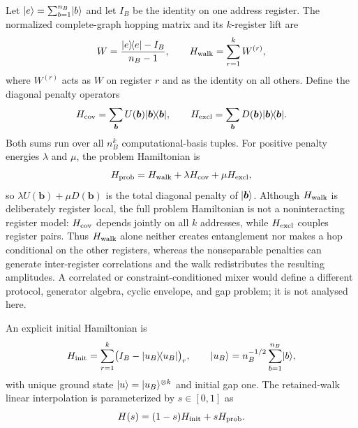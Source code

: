 Let $\lvert e\rangle=\sum_{b=1}^{n_B}\lvert b\rangle$ and let $I_B$ be the
identity on one address register.  The normalized complete-graph hopping
matrix and its $k$-register lift are
\begin{equation}
 W=\frac{\lvert e\rangle\!\langle e\rvert-I_B}{n_B-1},
 \qquad
 H_{\rm walk}=\sum_{r=1}^k W^{(r)},
 \label{eq:walk-definition}
\end{equation}
where $W^{(r)}$ acts as $W$ on register $r$ and as the identity on all
others.  Define the diagonal penalty operators
\begin{equation}
 H_{\rm cov}=\sum_{\boldsymbol b}U(\boldsymbol b)
 \lvert\boldsymbol b\rangle\!\langle\boldsymbol b\rvert,
 \qquad
 H_{\rm excl}=\sum_{\boldsymbol b}D(\boldsymbol b)
 \lvert\boldsymbol b\rangle\!\langle\boldsymbol b\rvert.
 \label{eq:penalty-definitions}
\end{equation}
Both sums run over all $n_B^k$ computational-basis tuples.
For positive penalty energies $\lambda$ and $\mu$, the problem Hamiltonian
is
\begin{equation}
 H_{\rm prob}=H_{\rm walk}+\lambda H_{\rm cov}+\mu H_{\rm excl},
 \label{eq:hprob-rewrite}
\end{equation}
so $\lambda U(\boldsymbol b)+\mu D(\boldsymbol b)$ is the total diagonal
penalty of $\lvert\boldsymbol b\rangle$.  Although $H_{\rm walk}$ is deliberately
register local, the full problem Hamiltonian is not a noninteracting
register model: $H_{\rm cov}$ depends jointly on all $k$ addresses, while
$H_{\rm excl}$ couples register pairs.  Thus $H_{\rm walk}$ alone neither
creates entanglement nor makes a hop conditional on the other registers,
whereas the nonseparable penalties can generate inter-register correlations
and the walk redistributes the resulting amplitudes.  A correlated or
constraint-conditioned mixer would define a different protocol, generator
algebra, cyclic envelope, and gap problem; it is not analysed here.

An explicit initial Hamiltonian is
\begin{equation}
 H_{\rm init}=\sum_{r=1}^k\bigl(I_B-\lvert u_B\rangle\!\langle u_B\rvert\bigr)_r,
 \qquad
 \lvert u_B\rangle=n_B^{-1/2}\sum_{b=1}^{n_B}\lvert b\rangle,
 \label{eq:hinit-rewrite}
\end{equation}
with unique ground state $\lvert u\rangle=\lvert u_B\rangle^{\otimes k}$ and initial gap one.
The retained-walk linear interpolation is parameterized by $s\in[0,1]$ as
\begin{equation}
 H(s)=(1-s)H_{\rm init}+sH_{\rm prob}.
 \label{eq:cycle-linear-rewrite}
\end{equation}

